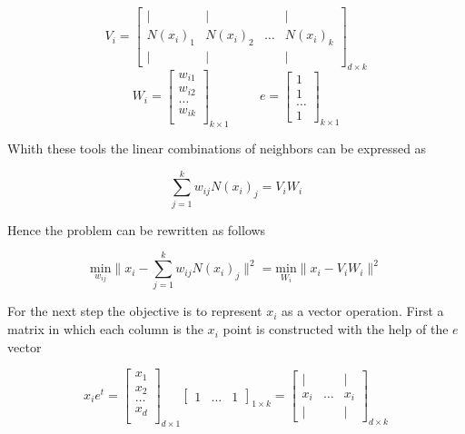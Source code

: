 \documentclass[12pt,journal]{IEEEtran}
\begin{document}
    \[
        V_i =
        \begin{bmatrix}
            |      &  |     &       & | \\
            N(x_i)_1 & N(x_i)_2 & \dots & N(x_i)_k \\
            |      &  |     &       & |
        \end{bmatrix}_{d \times k}
    \]
    \[
        W_i =
        \begin{bmatrix}
            w_{i1}\\
            w_{i2}\\
            \dots \\
            w_{ik}\\
        \end{bmatrix}_{k \times 1}
        \hspace{1cm}
        e =
        \begin{bmatrix}
        1\\
        1\\
        \dots\\
        1
        \end{bmatrix}_{k \times 1}
    \]

    Whith these tools the linear combinations of neighbors can be expressed as

    \begin{equation*}
        \sum_{j=1}^k w_{ij} N(x_i)_j = V_i W_i
    \end{equation*}

    Hence the problem can be rewritten as follows

    \begin{equation*}
            \underset{w_{ij}}{\text{min}} \lVert x_i - \sum_{j=1}^k w_{ij} N(x_i)_j \rVert^2
            =
            \underset{W_i}{\text{min}} \lVert x_i - V_i W_i \rVert^2
    \end{equation*}

    For the next step the objective is to represent $x_i$ as a vector operation.
    First a matrix in which each column is the $x_i$ point is constructed with
    the help of the $e$ vector

    \[
        x_i e^t =
        \begin{bmatrix}
            x_1 \\
            x_2 \\
            \dots \\
            x_d \\
        \end{bmatrix}_{d \times 1}
        \begin{bmatrix}
            1 & \dots & 1
        \end{bmatrix}_{1 \times k}
        =
        \begin{bmatrix}
            |   &       & | \\
            x_i & \dots & x_i\\
            |   &       & |
        \end{bmatrix}_{d \times k}
    \]\\
\end{document}
